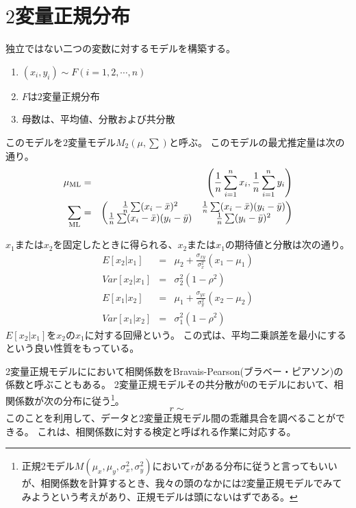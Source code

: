 \section{$2$変量正規分布}
独立ではない二つの変数に対するモデルを構築する。
\begin{enumerate}
 \item $(x_i,y_i)\sim F (i=1,2,\cdots,n)$
 \item $F$は$2$変量正規分布
 \item 母数は、平均値、分散および共分散
\end{enumerate}
このモデルを$2$変量モデル$M_{2}(\mu,\sum)$と呼ぶ。
このモデルの最尤推定量は次の通り。
\begin{eqnarray*}
 \mu_{\rm{ML}} &=& \left(\frac{1}{n}\sum_{i=1}^n x_i,\frac{1}{n}\sum_{i=1}^n y_i \right) \\
 \sum_{\rm{ML}} &=& \begin{pmatrix}
\frac{1}{n}\sum (x_i-\bar{x})^2 &  \frac{1}{n}\sum (x_i-\bar{x})(y_i-\bar{y})\\
\frac{1}{n}\sum (x_i-\bar{x})(y_i-\bar{y}) & \frac{1}{n}\sum (y_i-\bar{y})^2 \\
\end{pmatrix}
\end{eqnarray*}

$x_1$または$x_2$を固定したときに得られる、$x_2$または$x_1$の期待値と分散は次の通り。
\begin{eqnarray*}
 E[x_2|x_1] &=& \mu_2+\frac{\sigma_{xy}}{\sigma_x^2}(x_1-\mu_1)\\
 Var[x_2|x_1]  &=& \sigma_2^2(1-\rho^2) \\
 E[x_1|x_2] &=& \mu_1+\frac{\sigma_{yx}}{\sigma_y^2}(x_2-\mu_2)\\
 Var[x_1|x_2]  &=& \sigma_1^2(1-\rho^2)
\end{eqnarray*}
$E[x_2|x_1]$を$x_2$の$x_1$に対する回帰という。
この式は、平均二乗誤差を最小にするという良い性質をもっている。



%
2変量正規モデルににおいて相関係数をBravais-Pearson(ブラベー・ピアソン)の係数と呼ぶこともある。
2変量正規モデルその共分散が$0$のモデルにおいて、相関係数が次の分布に従う\footnote{正規2モデル$M(\mu_x,\mu_y,\sigma_x^2,\sigma_y^2)$において$r$がある分布に従うと言ってもいいが、相関係数を計算するとき、我々の頭のなかには2変量正規モデルでみてみようという考えがあり、正規モデルは頭にないはずである。}。
\begin{equation*}
 r \sim 
\end{equation*}
このことを利用して、データと2変量正規モデル間の乖離具合を調べることができる。
これは、相関係数に対する検定と呼ばれる作業に対応する。
